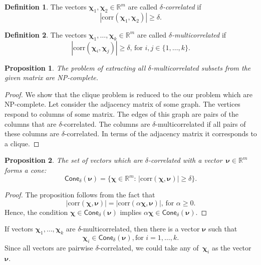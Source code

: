 \documentclass[12pt,twoside]{article}
\newtheorem{proposition}{Proposition}
\theoremstyle{definition}
\newtheorem{definition}{Definition}
\newcommand{\bbR}{\mathbb{R}}
\newcommand{\bchi}{\boldsymbol{\chi}}
\newcommand{\bnu}{\boldsymbol{\nu}}
\begin{document}
\hrulefill

\begin{definition}
	The vectors $\bchi_1, \bchi_2 \in \bbR^m$ are called \textit{$\delta$-correlated} if 
	\[
	|\text{corr} (\bchi_1, \bchi_2)| \geq \delta.
	\]
\end{definition}
\begin{definition}
	The vectors $\bchi_1, \dots, \bchi_k \in \bbR^m$ are called \textit{$\delta$-multicorrelated} if 
	\[
		|\text{corr} (\bchi_i, \bchi_j)| \geq \delta, \, \text{for } i, j \in \{1, \dots, k\}.
	\]
\end{definition}

\begin{proposition}
	The problem of extracting all $\delta$-multicorrelated subsets from the given matrix are NP-complete.
\end{proposition}
\begin{proof}
	We show that the clique problem is reduced to the our problem which are NP-complete. 
	Let consider the adjacency matrix of some graph. 
	The vertices respond to columns of some matrix. 
	The edges of this graph are pairs of the columns that are $\delta$-correlated.
	The columns are $\delta$-multicorrelated if all pairs of these columns are $\delta$-correlated.
	In terms of the adjacency matrix it corresponds to a clique.
\end{proof}
\begin{proposition}
	The set of vectors which are $\delta$-correlated with a vector~$\bnu \in \bbR^m$ forms a cone:
	\[
	\textsf{Cone}_{\delta} (\bnu) = \{ \bchi \in \bbR^m: \, |\text{corr}(\bchi, \bnu)| \geq \delta \}.
	\]
\end{proposition}
\begin{proof}
	The proposition follows from the fact that 
	\[
	|\text{corr}(\bchi, \bnu)| = | \text{corr}(\alpha \bchi, \bnu)|, \, \text{for } \alpha \geq 0.
	\]
	Hence, the condition $\bchi \in \textsf{Cone}_{\delta} (\bnu)$ implies $\alpha \bchi \in \textsf{Cone}_{\delta} (\bnu)$.
\end{proof}

	If vectors $\bchi_1, \dots, \bchi_k$ are $\delta$-multicorrelated, then there is a vector $\bnu$ such that 
	\[
		\bchi_i \in \textsf{Cone}_{\delta}(\bnu), \text{for } i = 1, \dots, k.
	\]
	Since all vectors are pairwise $\delta$-correlated, we could take any of~$\bchi_i$ as the vector~$\bnu$.
\end{document}
